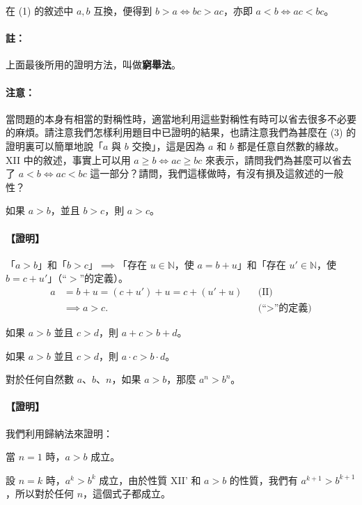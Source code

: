 在 (1) 的敘述中 $a, b$ 互換，便得到 $b > a \iff bc > ac$，亦即 $a < b \iff ac < bc$。

\paragraph{註：}上面最後所用的證明方法，叫做\textbf{窮舉法}。

\paragraph{注意：}當問題的本身有相當的對稱性時，適當地利用這些對稱性有時可以省去很多不必要的麻煩。請注意我們怎樣利用題目中已證明的結果，也請注意我們為甚麼在 (3) 的證明裏可以簡單地說「$a$ 與 $b$ 交換」，這是因為 $a$ 和 $b$ 都是任意自然數的緣故。XII 中的敘述，事實上可以用 $a \ge b \iff ac \ge bc$ 來表示，請問我們為甚麼可以省去了 $a < b \iff ac < bc$ 這一部分？請問，我們這樣做時，有沒有損及這敘述的一般性？

\medskip
{} 如果 $a > b$，並且 $b > c$，則 $a > c$。

\paragraph{【證明】}「$a > b$」和「$b > c$」$\implies$「存在 $u \in \mathbb{N}$，使 $a=b+u$」和「存在 $u' \in \mathbb{N}$，使 $b=c+u'$」（“$>$”的定義）。
\begin{align*}
  a &= b+u = (c+u')+u = c+(u'+u) && \text{(II)} \\
  &\implies a > c. && \text{(“$>$”的定義)}
\end{align*}

\medskip
{} 如果 $a > b$ 並且 $c > d$，則 $a+c > b+d$。

\medskip
{} 如果 $a > b$ 並且 $c > d$，則 $a \cdot c > b \cdot d$。

\medskip
\setcounter{example}{0}
\begin{example}\label{ex:b1-3-3}
對於任何自然數 $a$、$b$、$n$，如果 $a > b$，那麼 $a^n > b^n$。
\end{example}

\paragraph{【證明】}我們利用歸納法來證明：

當 $n=1$ 時，$a > b$ 成立。

設 $n=k$ 時，$a^k > b^k$ 成立，由於性質 XII' 和 $a > b$ 的性質，我們有 $a^{k+1} > b^{k+1}$，所以對於任何 $n$，這個式子都成立。

